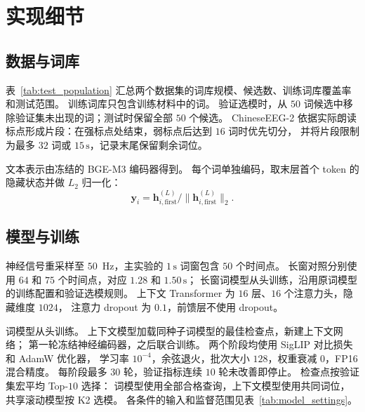 
\section{实现细节}
\label{sec:supp_settings}

\subsection{数据与词库}

表~\ref{tab:test_population} 汇总两个数据集的词库规模、候选数、训练词库覆盖率和测试范围。
训练词库只包含训练材料中的词。
验证选模时，从 $50$ 词候选中移除验证集未出现的词；测试时保留全部 $50$ 个候选。
ChineseEEG-2 依据实际朗读标点形成片段：在强标点处结束，弱标点后达到 $16$ 词时优先切分，
并将片段限制为最多 $32$ 词或 $15\,\mathrm{s}$，记录末尾保留剩余词位。

\begin{table}[htbp]
    \centering
    \papertablestyle
    \caption{词库、候选数及测试评价范围。查询数、片段数和词位数按一次模型评价计。}
    \label{tab:test_population}
    
\end{table}

文本表示由冻结的 BGE-M3 编码器得到。
每个词单独编码，取末层首个 token 的隐藏状态并做 $L_2$ 归一化：
\[
\mathbf y_i=\mathbf h_{i,\mathrm{first}}^{(L)}\big/\|\mathbf h_{i,\mathrm{first}}^{(L)}\|_2 .
\]


\subsection{模型与训练}
\label{sec:supp_model_training}

神经信号重采样至 $50$~Hz，主实验的 $1\,\mathrm{s}$ 词窗包含 $50$ 个时间点。
长窗对照分别使用 $64$ 和 $75$ 个时间点，对应 $1.28$ 和 $1.50\,\mathrm{s}$；
长窗词模型从头训练，沿用原词模型的训练配置和验证选模规则。
上下文 Transformer 为 $16$ 层、$16$ 个注意力头，隐藏维度 $1024$，
注意力 dropout 为 $0.1$，前馈层不使用 dropout。

词模型从头训练。
上下文模型加载同种子词模型的最佳检查点，新建上下文网络；
第一轮冻结神经编码器，之后联合训练。
两个阶段均使用 SigLIP 对比损失\cite{zhai2023siglip} 和 AdamW 优化器，
学习率 $10^{-4}$，余弦退火，批次大小 $128$，权重衰减 $0$，FP16 混合精度。
每阶段最多 $30$ 轮，验证指标连续 $10$ 轮未改善即停止。
检查点按验证集宏平均 Top-$10$ 选择：
词模型使用全部合格查询，上下文模型使用共同词位，共享滚动模型按 K2 选模。
各条件的输入和监督范围见表~\ref{tab:model_settings}。

